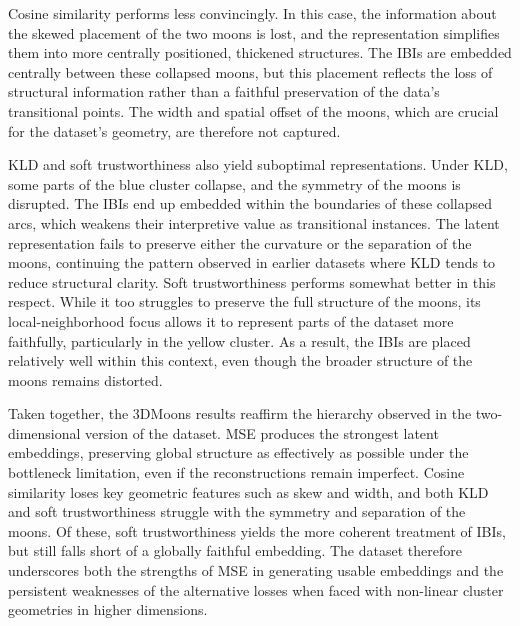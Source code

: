 Cosine similarity performs less convincingly. In this case, the information about the skewed placement of the two moons is lost, and the representation simplifies them into more centrally positioned, thickened structures. The IBIs are embedded centrally between these collapsed moons, but this placement reflects the loss of structural information rather than a faithful preservation of the data’s transitional points. The width and spatial offset of the moons, which are crucial for the dataset’s geometry, are therefore not captured.

KLD and soft trustworthiness also yield suboptimal representations. Under KLD, some parts of the blue cluster collapse, and the symmetry of the moons is disrupted. The IBIs end up embedded within the boundaries of these collapsed arcs, which weakens their interpretive value as transitional instances. The latent representation fails to preserve either the curvature or the separation of the moons, continuing the pattern observed in earlier datasets where KLD tends to reduce structural clarity. Soft trustworthiness performs somewhat better in this respect. While it too struggles to preserve the full structure of the moons, its local-neighborhood focus allows it to represent parts of the dataset more faithfully, particularly in the yellow cluster. As a result, the IBIs are placed relatively well within this context, even though the broader structure of the moons remains distorted.

Taken together, the 3DMoons results reaffirm the hierarchy observed in the two-dimensional version of the dataset. MSE produces the strongest latent embeddings, preserving global structure as effectively as possible under the bottleneck limitation, even if the reconstructions remain imperfect. Cosine similarity loses key geometric features such as skew and width, and both KLD and soft trustworthiness struggle with the symmetry and separation of the moons. Of these, soft trustworthiness yields the more coherent treatment of IBIs, but still falls short of a globally faithful embedding. The dataset therefore underscores both the strengths of MSE in generating usable embeddings and the persistent weaknesses of the alternative losses when faced with non-linear cluster geometries in higher dimensions.

